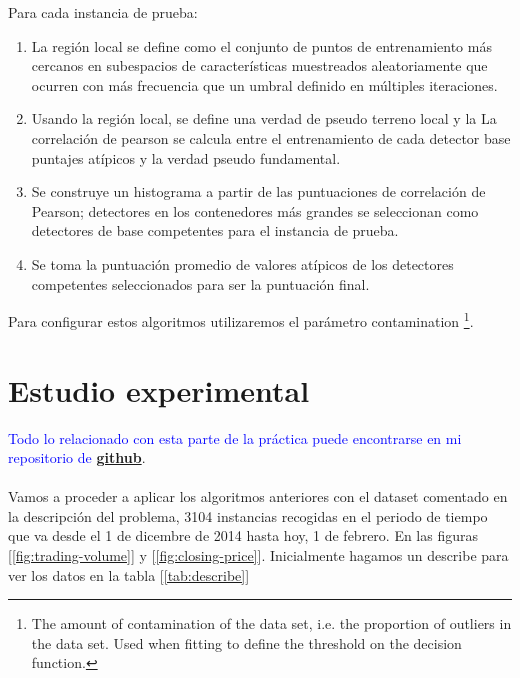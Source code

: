 \documentclass[12pt,twoside]{report}
\begin{document}
\begin{enumerate}
\begin{enumerate}
    Para cada instancia de prueba:
    	\begin{enumerate}
       \item La región local se define como el conjunto de puntos de entrenamiento más cercanos en
    subespacios de características muestreados aleatoriamente que ocurren con más frecuencia que
    un umbral definido en múltiples iteraciones.

    \item Usando la región local, se define una verdad de pseudo terreno local y la
    La correlación de pearson se calcula entre el entrenamiento de cada detector base
    puntajes atípicos y la verdad pseudo fundamental.

\item Se construye un histograma a partir de las puntuaciones de correlación de Pearson; detectores en
    los contenedores más grandes se seleccionan como detectores de base competentes para el
    instancia de prueba.

    \item Se toma la puntuación promedio de valores atípicos de los detectores competentes seleccionados
    para ser la puntuación final.
    	\end{enumerate}
	\end{enumerate}
\end{enumerate}

Para configurar estos algoritmos utilizaremos el parámetro contamination \footnote{The amount of contamination of the data set, i.e. the proportion of outliers in the data set. Used when fitting to define the threshold on the decision function.}.

\chapter*{Estudio experimental}

\textcolor{blue}{Todo lo relacionado con esta parte de la práctica puede encontrarse en mi repositorio de \textbf{\href{https://github.com/daviduster/anomaly-detection-stock}{github}}}.\\
\\

Vamos a proceder a aplicar los algoritmos anteriores con el dataset comentado en la descripción del problema, 3104 instancias recogidas en el periodo de tiempo que va desde el 1 de dicembre de 2014 hasta hoy, 1 de febrero. En las figuras [\ref{fig:trading-volume}] y [\ref{fig:closing-price}]. Inicialmente hagamos un describe para ver los datos en la tabla [\ref{tab:describe}]
\end{document}
